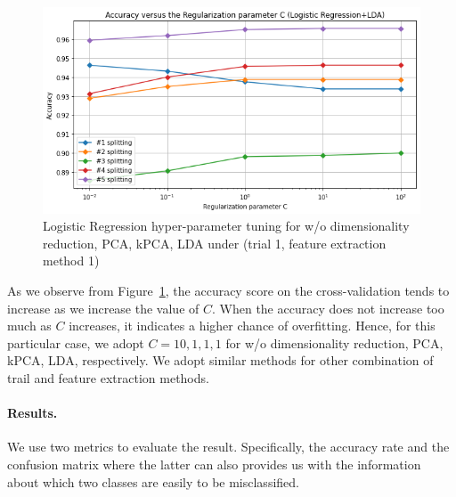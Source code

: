 \documentclass{article}
\begin{document}
\begin{figure}[!htb]
\endminipage\hfill
{}
  \includegraphics[width=\linewidth]{figure/logit_lda.png}
\endminipage
\caption{Logistic Regression hyper-parameter tuning for w/o dimensionality reduction, PCA, kPCA, LDA under (trial 1, feature extraction method 1)}
\label{logit_hyper}
\end{figure}

As we observe from Figure~\ref{logit_hyper}, the accuracy score on the cross-validation tends to increase as we increase the value of $C$. When the accuracy does not increase too much as $C$ increases, it indicates a higher chance of overfitting. Hence, for this particular case, we adopt $C = 10, 1, 1, 1$ for  w/o dimensionality reduction, PCA, kPCA, LDA, respectively. We adopt similar methods for other combination of trail and feature extraction methods.

\paragraph{Results.}
We use two metrics to evaluate the result. Specifically, the accuracy rate and the confusion matrix where the latter can also provides us with the information about which two classes are easily to be misclassified.
\end{document}
